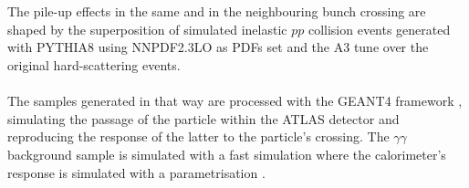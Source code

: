 \\\\
The pile-up effects in the same and in the neighbouring bunch crossing are shaped by the superposition of simulated inelastic $pp$ collision events generated with P{\scriptsize YTHIA}8 using NNPDF2.3LO as PDFs \cite{Ball_2013} set and the A3 tune \cite{ATL-PHYS-PUB-2016-017} over the original hard-scattering events.
\\\\
The samples generated in that way are processed with the G{\scriptsize EANT}4 framework \cite{AGOSTINELLI2003250}, simulating the passage of the particle within the ATLAS detector \cite{Aad_2010} and reproducing the response of the latter to the particle's crossing. The $\gamma\gamma$ background sample is simulated with a fast simulation where the calorimeter's response is simulated with a parametrisation \cite{ATLAS_1300517}.

